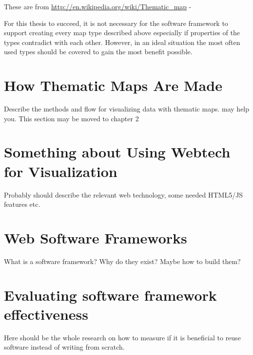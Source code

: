 These are from \url{http://en.wikipedia.org/wiki/Thematic_map} - 

For this thesis to succeed, it is not necessary for the software framework to support creating every map type described above especially if properties of the types contradict with each other. However, in an ideal situation the most often used types should be covered to gain the most benefit possible.

\section{How Thematic Maps Are Made}

Describe the methods and flow for visualizing data with thematic maps. \citet{schlichtmann_visualization_2002} may help you. This section may be moved to chapter 2

\section{Something about Using Webtech for Visualization}

Probably should describe the relevant web technology, some needed HTML5/JS features etc. 

\section{Web Software Frameworks}

What is a software framework? Why do they exist? Maybe how to build them?

\section{Evaluating software framework effectiveness}

Here should be the whole research on how to measure if it is beneficial to reuse software instead of writing from scratch.
